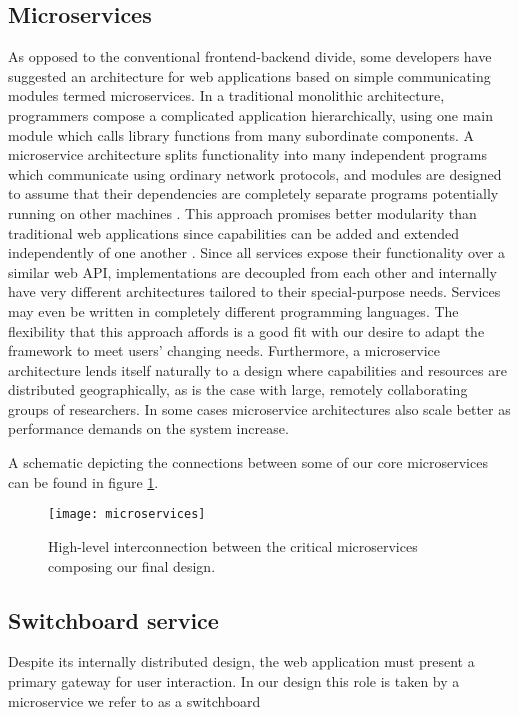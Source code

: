 \documentclass[../thesis]{subfiles}
\begin{document}
\subsection{Microservices}
As opposed to the conventional \gls{frontend}-\gls{backend} divide, some
developers have suggested an architecture for web applications based
on simple communicating modules termed \glspl{microservice}. In a
traditional monolithic architecture, programmers compose a complicated
application hierarchically, using one main module which calls library
functions from many subordinate components.  A microservice
architecture splits functionality into many independent programs which
communicate using ordinary network protocols, and modules are designed
to assume that their dependencies are completely separate programs
potentially running on other machines \cite{Micro14:online}.  This
approach promises better modularity than traditional web applications
since capabilities can be added and extended independently of one
another \cite{Balalaie2016}. Since all services expose their
functionality over a similar web \gls{API}, implementations are
decoupled from each other and internally have very different
architectures tailored to their special-purpose needs.  Services may
even be written in completely different programming languages. The
flexibility that this approach affords is a good fit with our desire
to adapt the framework to meet users' changing needs. Furthermore, a
microservice architecture lends itself naturally to a design where
capabilities and resources are distributed geographically, as is the
case with large, remotely collaborating groups of researchers. In some
cases microservice architectures also scale better as performance
demands on the system increase.

A schematic depicting the connections between some of our core
microservices can be found in figure \ref{fig:Microservices}.

\begin{figure}
  \texttt{[image: microservices]}
  \caption{
    High-level interconnection between the critical microservices
    composing our final design.
    \label{fig:Microservices}
  }
\end{figure}

\subsection{Switchboard service}
Despite its internally distributed design, the web application must
present a primary gateway for user interaction. In our design this
role is taken by a microservice we refer to as a \gls{switchboard}
\end{document}
